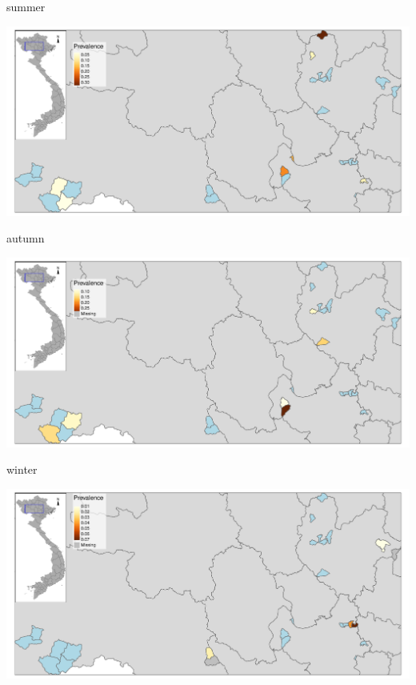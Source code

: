 \begin{frame}
summer\\
\begin{center}
\includegraphics[width=1\textwidth]{map04_summer.pdf}
\end{center}
\end{frame}


\begin{frame}
autumn\\
\begin{center}
\includegraphics[width=1\textwidth]{map04_autumn.pdf}
\end{center}
\end{frame}

\begin{frame}
winter\\
\begin{center}
\includegraphics[width=1\textwidth]{map04_winter.pdf}
\end{center}
\end{frame}


